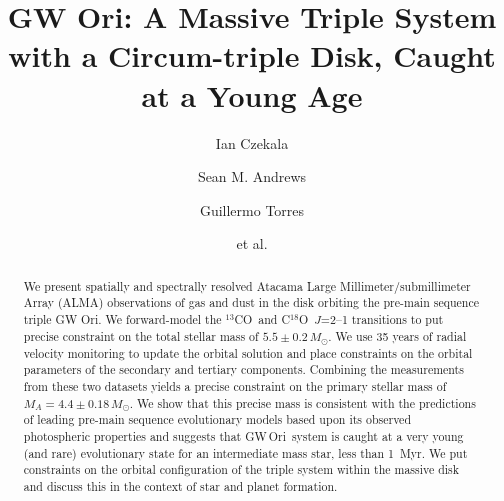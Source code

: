 \documentclass[twocolumn]{aastex61}
\newcommand{\gw}{GW\,Ori}
\newcommand{\thirteen}{${}^{13}$CO}
\newcommand{\eighteen}{C${}^{18}$O}
\begin{document}
\title{GW Ori: A Massive Triple System with a Circum-triple Disk, Caught at a Young Age}


\author[0000-0002-1483-8811]{Ian Czekala} %

\author{Sean M. Andrews}

\author{Guillermo Torres}

\author{et al.}


\begin{abstract}
We present spatially and spectrally resolved Atacama Large Millimeter/submillimeter Array (ALMA) observations of gas and dust in the disk orbiting the pre-main sequence triple GW Ori. We forward-model the \thirteen\ and \eighteen\ $J$=2--1 transitions to put precise constraint on the total stellar mass of $5.5 \pm 0.2\,M_\odot$. We use 35 years of radial velocity monitoring to update the orbital solution and place constraints on the orbital parameters of the secondary and tertiary components. Combining the measurements from these two datasets yields a precise constraint on the primary stellar mass of $M_A = 4.4\pm 0.18\,M_\odot$. We show that this precise mass is consistent with the predictions of leading pre-main sequence evolutionary models based upon its observed photospheric properties and suggests that \gw\ system is caught at a very young (and rare) evolutionary state for an intermediate mass star, less than 1~Myr. We put constraints on the orbital configuration of the triple system within the massive disk and discuss this in the context of star and planet formation.
\end{abstract}
\end{document}
